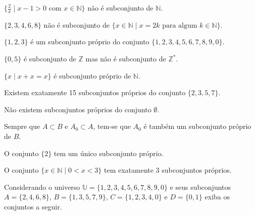 \begin{exerList}
	\item $\Big\{\frac{2}{x} \mid x - 1 > 0 \mbox{ com } x \in \mathbb{N}\Big\}$ não é subconjunto de $\mathbb{N}$.
	\item $\{2, 3, 4, 6, 8\}$ não é subconjunto de $\{x \in \mathbb{N} \mid  x = 2k \mbox{ para algum } k \in \mathbb{N}\}$.
	\item $\{1, 2, 3\}$ é um subconjunto próprio do conjunto $\{1, 2, 3, 4, 5, 6, 7,8,9,0\}$.
	\item $\{0, 5\}$ é subconjunto de $\mathbb{Z}$ mas não é subconjunto de $\mathbb{Z}^*$.
	\item $\{ x \mid x + x = x\}$ é subconjunto próprio de $\mathbb{N}$.
	\item Existem exatamente 15 subconjuntos próprios do conjunto $\{2, 3, 5, 7\}$.
	\item Não existem subconjuntos próprios do conjunto $\emptyset$.
	\item Sempre que $A \subset B$ e $A_0 \subset A$, tem-se que $A_0$ é também um subconjunto próprio de $B$.
	\item O conjunto $\{2\}$ tem um único subconjunto próprio.
	\item O conjunto $\{x \in \mathbb{N} \mid 0 < x < 3\}$ tem exatamente 3 subconjuntos próprios.
\end{exerList}

\begin{questao}\label{test:Conjuntos9}
	Considerando o universo $\mathbb{U} = \{1, 2, 3, 4, 5, 6, 7, 8, 9, 0\}$ e seus subconjuntos $A = \{2, 4, 6, 8\}$, $B = \{1, 3, 5, 7, 9\}$, $C = \{1, 2, 3, 4, 0\}$ e $D = \{0, 1\}$ exiba os conjuntos a seguir.
\end{questao}

